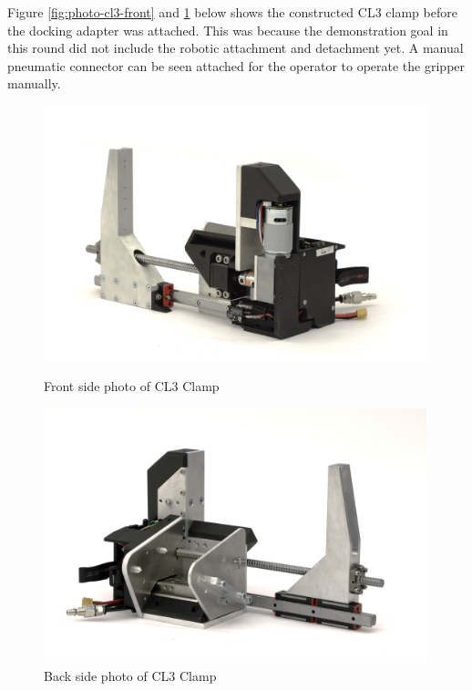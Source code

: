 Figure \ref{fig:photo-cl3-front} and \ref{fig:photo-cl3-back} below shows the constructed CL3 clamp before the docking adapter was attached. This was because the demonstration goal in this round did not include the robotic attachment and detachment yet. A manual pneumatic connector can be seen attached for the operator to operate the gripper manually.

\begin{figure}
    \centering
    \includegraphics[width=0.99\textwidth]{images/05/CL3_Back.jpg}
    \caption{Front side photo of CL3 Clamp}
    \label{fig:photo-cl3-front}

    \centering
    \includegraphics[width=0.99\textwidth]{images/05/CL3_Front.jpg}
    \caption{Back side photo of CL3 Clamp}
    \label{fig:photo-cl3-back}
\end{figure}

\FloatBarrier

